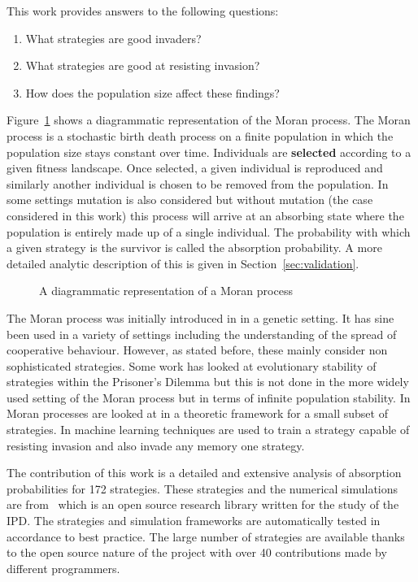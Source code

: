 \documentclass{article}
\begin{document}
This work provides answers to the following questions:

\begin{enumerate}
    \item What strategies are good invaders?
    \item What strategies are good at resisting invasion?
    \item How does the population size affect these findings?
\end{enumerate}

Figure~\ref{fig:moran_process} shows a diagrammatic representation of the Moran
process. The Moran process is a stochastic birth death process on a finite
population in which the population size stays constant over time. Individuals
are \textbf{selected} according to a given fitness landscape. Once selected, a
given individual is reproduced and similarly another individual is chosen to be
removed from the population. In some settings mutation is also considered but
without mutation (the case considered in this work) this process will arrive at
an absorbing state where the population is entirely made up of a single
individual. The probability with which a given strategy is the survivor is
called the absorption probability. A more detailed analytic description of this
is given in Section~\ref{sec:validation}.

\begin{figure}[!hbtp]
    \centering
    
    \caption{A diagrammatic representation of a Moran process}
    \label{fig:moran_process}
\end{figure}

The Moran process was initially introduced in \cite{Moran1957} in a genetic
setting. It has sine been used in a variety of settings including the
understanding of the spread of cooperative behaviour. However, as stated before,
these mainly consider non sophisticated strategies. Some work has looked at
evolutionary stability of strategies within the Prisoner's Dilemma \cite{Li2014}
but this is not done in the more widely used setting of the Moran process but in
terms of infinite population stability. In \cite{Baek2016} Moran processes are
looked at in a theoretic framework for a small subset of strategies. In
\cite{Lee2015} machine learning techniques are used to train a strategy capable
of resisting invasion and also invade any memory one strategy.

The contribution of this work is a detailed and extensive analysis of absorption
probabilities for 172 strategies. These strategies and the numerical simulations
are from~\cite{axelrodproject} which is an open source research library written
for the study of the IPD\@. The strategies and simulation frameworks are
automatically tested in accordance to best practice. The large number of
strategies are available thanks to the open source nature of the project with
over 40 contributions made by different programmers.
\end{document}
